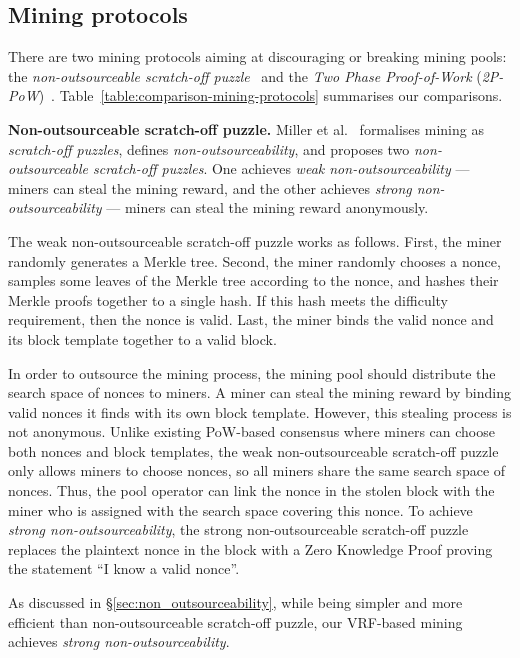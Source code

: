 \subsection{Mining protocols}

There are two mining protocols aiming at discouraging or breaking mining pools: the \textit{non-outsourceable scratch-off puzzle}~\cite{miller2015nonoutsourceable} and the \textit{Two Phase Proof-of-Work} (\textit{2P-PoW})~\cite{2P-PoW}.
Table~\ref{table:comparison-mining-protocols} summarises our comparisons.

\textbf{Non-outsourceable scratch-off puzzle.}
Miller et al.~\cite{miller2015nonoutsourceable} formalises mining as \emph{scratch-off puzzles}, defines \emph{non-outsourceability}, and proposes two \emph{non-outsourceable scratch-off puzzles}.
One achieves \emph{weak non-outsourceability} --- miners can steal the mining reward, and the other achieves \emph{strong non-outsourceability} --- miners can steal the mining reward anonymously.

The weak non-outsourceable scratch-off puzzle works as follows.
First, the miner randomly generates a Merkle tree.
Second, the miner randomly chooses a nonce, samples some leaves of the Merkle tree according to the nonce, and hashes their Merkle proofs together to a single hash.
If this hash meets the difficulty requirement, then the nonce is valid.
Last, the miner binds the valid nonce and its block template together to a valid block.

In order to outsource the mining process, the mining pool should distribute the search space of nonces to miners.
A miner can steal the mining reward by binding valid nonces it finds with its own block template.
However, this stealing process is not anonymous.
Unlike existing PoW-based consensus where miners can choose both nonces and block templates, the weak non-outsourceable scratch-off puzzle only allows miners to choose nonces, so all miners share the same search space of nonces.
Thus, the pool operator can link the nonce in the stolen block with the miner who is assigned with the search space covering this nonce.
To achieve \emph{strong non-outsourceability}, the strong non-outsourceable scratch-off puzzle replaces the plaintext nonce in the block with a Zero Knowledge Proof proving the statement ``I know a valid nonce''.

As discussed in \S\ref{sec:non_outsourceability}, while being simpler and more efficient than non-outsourceable scratch-off puzzle, our VRF-based mining achieves \emph{strong non-outsourceability}.

